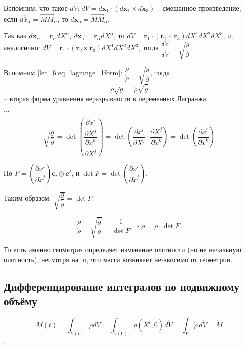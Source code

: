Вспомним, что такое $d\mathring{V}$: $d\mathring{V} = d\mathbf{x}_1 \cdot \left( d\mathring{\mathbf{x}}_1 \times d\mathring{\mathbf{x}}_3 \right) $ -- смешанное произведение, если $d\mathring{\bar{x}}_\alpha = \vec{MM}_\alpha$, то $d\mathbf{x}_\alpha = \vec{MM}_\alpha$.

Так как $d\mathring{\mathbf{x}}_\alpha = \mathring{\mathbf{r}}_\alpha dX^\alpha$,
$d\mathbf{x}_\alpha = \mathbf{r}_\alpha dX^\alpha$, то $d\mathring{V} = \mathring{\mathbf{r}}_1 \cdot \left( \mathring{\mathbf{r}}_2 \times \mathring{\mathbf{r}}_3 \right) dX^1 dX^2 dX^3 $,
и, аналогично: $dV = \mathbf{r}_1 \cdot \left(\mathbf{r}_2 \times \mathbf{r}_3 \right) dX^1 dX^2 dX^3$, тогда $ \dfrac{dV}{d\mathring{V}} = \sqrt{\dfrac{g}{\mathring{g}}} $.

Вспомним \eqref{lec_6:eq_lagrange_1form}: $ \dfrac{\rho}{\mathring{\rho}} = \sqrt{\dfrac{g}{\mathring{g}}} $, тогда
\[
  \rho \sqrt{g} = \mathring{\rho} \sqrt{\mathring{g}}
\]
-- вторая форма уравнения неразрывности в переменных Лагранжа.

$\dots$

\[
  \sqrt{\dfrac{g}{\mathring{g}}}
  = \det\left(\dfrac{\dfrac{\partial x^i}{\partial X^j}}{\dfrac{\partial \mathring{x}^k}{\partial X^j}}\right)
  = \det\left({\dfrac{\partial x^i}{\partial X^j} \cdot \dfrac{\partial X^j}{\partial \mathring{x}^k}}\right)
  = \det \left( \dfrac{\partial x^i}{\partial \mathring{x}^k}  \right) 
\]

Но $F = \left( \dfrac{\partial x^i}{\partial \mathring{x}^j}  \right) \bar{\mathbf{e}_i} \otimes \bar{\mathbf{e}}^j$,
и $\det F = \det \left( \dfrac{\partial x^i}{\partial \mathring{x}^j}  \right) $.

Таким образом: $\sqrt{\dfrac{g}{\mathring{g}}} = \det F$.

\[
  \dfrac{\rho}{\mathring{\rho}} = \sqrt{\dfrac{\mathring{g}}{g}} = \dfrac{1}{\det F}
  \Rightarrow
  \mathring{\rho} = \rho \cdot \det F.
\]

То есть именно геометрия определяет изменение плотности (но не начальную плотность), несмотря
на то, что масса возникает независимо от геометрии.



\subsection{Дифференцирование интегралов по подвижному объёму}

\[
  M(t) = \int_{V(t)} \rho dV
  = \int_{V(0)} \rho(X^i, 0) \, d\mathring{V}
  = \int_{\mathring{V}} \mathring{\rho} \, d\mathring{V}
  = \mathring{M}
\]
.

